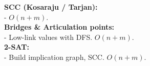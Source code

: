\textbf{SCC (Kosaraju / Tarjan):} \\[1mm]
- $O(n+m)$. \\
\textbf{Bridges \& Articulation points:} \\[1mm]
- Low-link values with DFS. $O(n+m)$. \\

\textbf{2-SAT:} \\[1mm]
- Build implication graph, SCC. $O(n+m)$. \\
